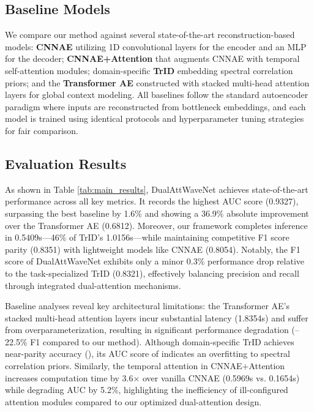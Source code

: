 \documentclass[conference]{IEEEtran}
\begin{document}
\subsection{Baseline Models}

We compare our method against several state-of-the-art reconstruction-based models: \textbf{CNNAE} utilizing 1D convolutional layers for the encoder and an MLP for the decoder; \textbf{CNNAE+Attention} that augments CNNAE with temporal self-attention modules; domain-specific \textbf{TrID} embedding spectral correlation priors; and the \textbf{Transformer AE} constructed with stacked multi-head attention layers for global context modeling. All baselines follow the standard autoencoder paradigm where inputs are reconstructed from bottleneck embeddings, and each model is trained using identical protocols and hyperparameter tuning strategies for fair comparison.

\subsection{Evaluation Results}

As shown in Table \ref{tab:main_results}, DualAttWaveNet achieves state-of-the-art performance across all key metrics. It records the highest AUC score (0.9327), surpassing the best baseline by 1.6\% and showing a 36.9\% absolute improvement over the Transformer AE (0.6812). Moreover, our framework completes inference in 0.5409s—46\% of TrID's 1.0156s—while maintaining competitive F1 score parity (0.8351) with lightweight models like CNNAE (0.8054). Notably, the F1 score of DualAttWaveNet exhibits only a minor 0.3\% performance drop relative to the task-specialized TrID (0.8321), effectively balancing precision and recall through integrated dual-attention mechanisms.

Baseline analyses reveal key architectural limitations: the Transformer AE's stacked multi-head attention layers incur substantial latency (1.8354s) and suffer from overparameterization, resulting in significant performance degradation (–22.5\% F1 compared to our method). Although domain-specific TrID achieves near-parity accuracy (), its AUC score of  indicates an overfitting to spectral correlation priors. Similarly, the temporal attention in CNNAE+Attention increases computation time by 3.6× over vanilla CNNAE (0.5969s vs. 0.1654s) while degrading AUC by 5.2\%, highlighting the inefficiency of ill-configured attention modules compared to our optimized dual-attention design.
\end{document}
